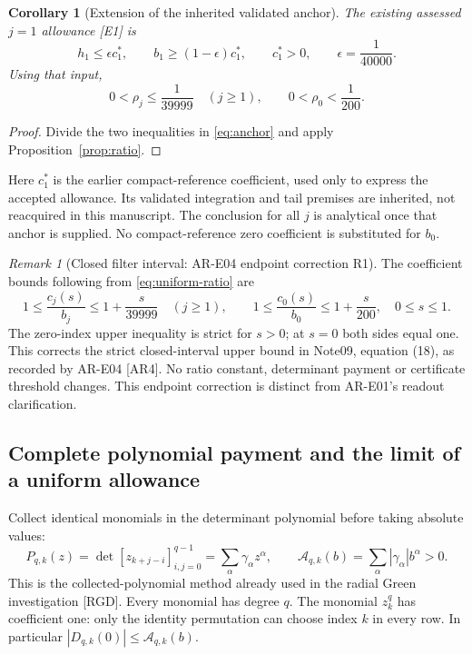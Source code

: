 \documentclass[11pt,letterpaper]{article}
\numberwithin{equation}{section}
\newtheorem{corollary}[theorem]{Corollary}
\theoremstyle{remark}
\newtheorem{remark}[theorem]{Remark}
\newcommand{\evid}[1]{\textsf{[#1]}}
\newcommand{\Acal}{\mathcal A}
\begin{document}
\begin{corollary}[Extension of the inherited validated anchor]
\label{cor:anchor}
The existing assessed \(j=1\) allowance \evid{E1} is
\begin{equation}
 h_1\le\epsilon c_1^*,\qquad
 b_1\ge(1-\epsilon)c_1^*,\qquad c_1^*>0,\qquad
 \epsilon=\frac1{40000}.
 \label{eq:anchor}
\end{equation}
Using that input,
\begin{equation}
 0<\rho_j\le\frac1{39999}\quad(j\ge1),\qquad
 0<\rho_0<\frac1{200}.
 \label{eq:uniform-ratio}
\end{equation}
\end{corollary}
\begin{proof}
Divide the two inequalities in \eqref{eq:anchor} and apply
Proposition~\ref{prop:ratio}.
\end{proof}

Here \(c_1^*\) is the earlier compact-reference coefficient, used only
to express the accepted allowance. Its validated integration and
tail premises are inherited, not reacquired in this manuscript.
The conclusion for all \(j\) is analytical once that anchor is supplied.
No compact-reference zero coefficient is substituted for \(b_0\).

\begin{remark}[Closed filter interval: AR-E04 endpoint correction R1]
\label{rem:ar4-endpoint}
The coefficient bounds following from \eqref{eq:uniform-ratio} are
\begin{equation}
 1\le\frac{c_j(s)}{b_j}\le1+\frac{s}{39999}\quad(j\ge1),\qquad
 1\le\frac{c_0(s)}{b_0}\le1+\frac{s}{200},\quad 0\le s\le1.
 \label{eq:closed-filter-ratios}
\end{equation}
The zero-index upper inequality is strict for \(s>0\); at \(s=0\)
both sides equal one. This corrects the strict closed-interval upper
bound in Note09, equation (18), as recorded by AR-E04 \evid{AR4}.
No ratio constant, determinant payment or certificate threshold changes.
This endpoint correction is distinct from AR-E01's readout clarification.
\end{remark}

\subsection{Complete polynomial payment and the limit of a uniform allowance}

Collect identical monomials in the determinant polynomial before
taking absolute values:
\begin{equation}
 P_{q,k}(z)=\det[z_{k+j-i}]_{i,j=0}^{q-1}
 =\sum_\alpha\gamma_\alpha z^\alpha,\qquad
 \Acal_{q,k}(b)=\sum_\alpha|\gamma_\alpha|b^\alpha>0.
 \label{eq:polynomial-norm}
\end{equation}
This is the collected-polynomial method already used in the radial
Green investigation \evid{RGD}. Every monomial has degree \(q\).
The monomial \(z_k^q\) has coefficient one: only the identity
permutation can choose index \(k\) in every row.
In particular \(|D_{q,k}(0)|\le\Acal_{q,k}(b)\).
\end{document}
